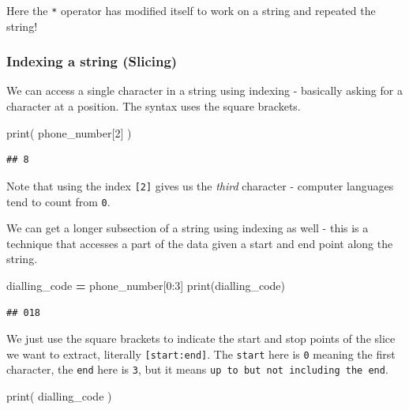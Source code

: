 \documentclass[]{book}
\newenvironment{Shaded}{\begin{snugshade}}{\end{snugshade}}
\newcommand{\BuiltInTok}[1]{#1}
\newcommand{\DecValTok}[1]{\textcolor[rgb]{0.00,0.00,0.81}{#1}}
\newcommand{\NormalTok}[1]{#1}
\newcommand{\OperatorTok}[1]{\textcolor[rgb]{0.81,0.36,0.00}{\textbf{#1}}}
\theoremstyle{definition}
\theoremstyle{definition}
\theoremstyle{definition}
\theoremstyle{remark}
\begin{document}
Here the \texttt{*} operator has modified itself to work on a string and
repeated the string!

\hypertarget{indexing-a-string-slicing}{%
\subsubsection{Indexing a string
(Slicing)}\label{indexing-a-string-slicing}}

We can access a single character in a string using indexing - basically
asking for a character at a position. The syntax uses the square
brackets.

\begin{Shaded}
\begin{Highlighting}[]
\BuiltInTok{print}\NormalTok{( phone_number[}\DecValTok{2}\NormalTok{] )}
\end{Highlighting}
\end{Shaded}

\begin{verbatim}
## 8
\end{verbatim}

Note that using the index \texttt{{[}2{]}} gives us the \emph{third}
character - computer languages tend to count from \texttt{0}.

We can get a longer subsection of a string using indexing as well - this
is a technique that accesses a part of the data given a start and end
point along the string.

\begin{Shaded}
\begin{Highlighting}[]
\NormalTok{dialling_code }\OperatorTok{=}\NormalTok{ phone_number[}\DecValTok{0}\NormalTok{:}\DecValTok{3}\NormalTok{]}
\BuiltInTok{print}\NormalTok{(dialling_code)}
\end{Highlighting}
\end{Shaded}

\begin{verbatim}
## 018
\end{verbatim}

We just use the square brackets to indicate the start and stop points of
the slice we want to extract, literally \texttt{{[}start:end{]}}. The
\texttt{start} here is \texttt{0} meaning the first character, the
\texttt{end} here is \texttt{3}, but it means
\texttt{up\ to\ but\ not\ including\ the\ end}.

\begin{Shaded}
\begin{Highlighting}[]
\BuiltInTok{print}\NormalTok{( dialling_code )}
\end{Highlighting}
\end{Shaded}
\end{document}
